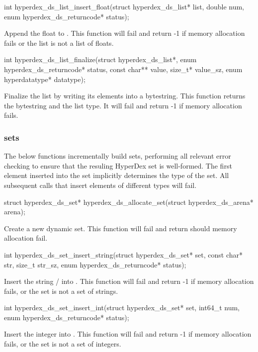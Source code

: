 \funcsep
\begin{ccode}
int hyperdex_ds_list_insert_float(struct hyperdex_ds_list* list, double num,
                                  enum hyperdex_ds_returncode* status);
\end{ccode}
\funcdesc Append the float  to .  This function will fail
and return -1 if memory allocation fails or the list is not a list of floats.

\funcsep
\begin{ccode}
int hyperdex_ds_list_finalize(struct hyperdex_ds_list*,
                              enum hyperdex_ds_returncode* status,
                              const char** value, size_t* value_sz,
                              enum hyperdatatype* datatype);
\end{ccode}
\funcdesc Finalize the list by writing its elements into a bytestring.  This
function returns the bytestring and the list type.  It will fail and return -1
if memory allocation fails.

\subsubsection{sets}

The below functions incrementally build sets, performing all relevant error
checking to ensure that the resuling HyperDex set is well-formed.  The first
element inserted into the set implicitly determines the type of the set.  All
subsequent calls that insert elements of different types will fail.

\begin{ccode}
struct hyperdex_ds_set* hyperdex_ds_allocate_set(struct hyperdex_ds_arena* arena);
\end{ccode}
\funcdesc Create a new dynamic set.  This function will fail and return
 should memory allocation fail.

\funcsep
\begin{ccode}
int hyperdex_ds_set_insert_string(struct hyperdex_ds_set* set,
                                  const char* str, size_t str_sz,
                                  enum hyperdex_ds_returncode* status);
\end{ccode}
\funcdesc Insert the string / into .  This
function will fail and return -1 if memory allocation fails, or the set is not a
set of strings.

\funcsep
\begin{ccode}
int hyperdex_ds_set_insert_int(struct hyperdex_ds_set* set, int64_t num,
                               enum hyperdex_ds_returncode* status);
\end{ccode}
\funcdesc Insert the integer  into .  This function will
fail and return -1 if memory allocation fails, or the set is not a set of
integers.

